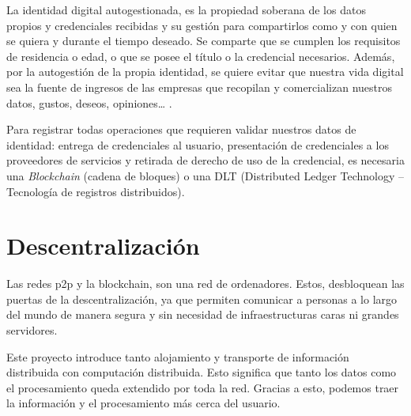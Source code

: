 La identidad digital autogestionada, es la propiedad soberana de los datos propios y credenciales recibidas y su gestión para compartirlos como y con quien se quiera y durante el tiempo deseado. Se comparte que se cumplen los requisitos de residencia o edad, o que se posee el título o la credencial necesarios. Además, por la autogestión de la propia identidad, se quiere evitar que nuestra vida digital sea la fuente de ingresos de las empresas que recopilan y comercializan nuestros datos, gustos, deseos, opiniones… .

Para registrar todas operaciones que requieren validar nuestros datos de identidad: entrega de credenciales al usuario, presentación de credenciales a los proveedores de servicios y retirada de derecho de uso de la credencial, es necesaria una \textit{Blockchain} (cadena de bloques) o una DLT (Distributed Ledger Technology – Tecnología de registros distribuidos).

\section{Descentralización}
Las redes p2p\cite{web:p2p} y la blockchain\cite{web:blockchain}, son una red de ordenadores. Estos, desbloquean las puertas de la descentralización, ya que permiten comunicar a personas a lo largo del mundo de manera segura y sin necesidad de infraestructuras caras ni grandes servidores.

Este proyecto introduce tanto alojamiento y transporte de información distribuida con computación distribuida. Esto significa que tanto los datos como el procesamiento queda extendido por toda la red. Gracias a esto, podemos traer la información y el procesamiento más cerca del usuario.

